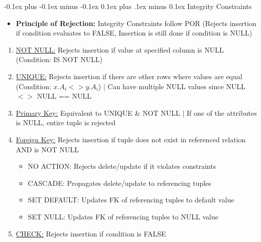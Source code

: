 \documentclass[landscape]{article}
\makeatletter
\renewcommand{\subsection}{\@startsection{subsection}{2}{0mm}%
  {-0.1ex plus -0.1ex minus -0.1ex}%
  {0.1ex plus .1ex minus 0.1ex}%
{\normalfont\scriptsize\bfseries}}
\makeatother
\begin{document}
\begin{multicols*}{5}
\begin{itemize}
      \subsection{Integrity Constraints}
      \begin{itemize}
        \item \textbf{Principle of Rejection:} Integrity Constraints follow POR (Rejects insertion if condition evaluates to FALSE, Insertion is still done if condition is NULL) 
      \end{itemize}
      \begin{enumerate}
        \item \underline{NOT NULL:} Rejects insertion if value at specified column is NULL (Condition: IS NOT NULL)
        \item \underline{UNIQUE:} Rejects insertion if there are other rows where values are equal (Condition: $x.A_i <> y.A_i$) $\vert$ Can have multiple NULL values since NULL $<>$ NULL == NULL
        \item \underline{Primary Key:} Equivalent to UNIQUE \& NOT NULL $\vert$ If one of the attributes is NULL, entire tuple is rejected
        \item \underline{Foreign Key:} Rejects insertion if tuple does not exist in referenced relation AND is NOT NULL
        \begin{itemize}
          \item NO ACTION: Rejects delete/update if it violates constraints
          \item CASCADE: Propagates delete/update to referencing tuples
          \item SET DEFAULT: Updates FK of referencing tuples to default value
          \item SET NULL: Updates FK of referencing tuples to NULL value
        \end{itemize}
        \item \underline{CHECK:} Rejects insertion if condition is FALSE
      \end{enumerate}
    \end{itemize}


\end{multicols*}
\end{document}

